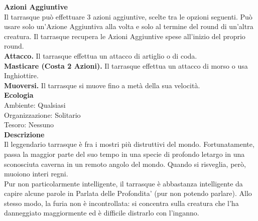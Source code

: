 \begin{multicols}{2}
\textbf{Azioni Aggiuntive}\\
Il tarrasque può effettuare 3 azioni aggiuntive, scelte tra le opzioni seguenti. Può usare solo un'Azione Aggiuntiva alla volta e solo al termine del round di un'altra creatura. Il tarrasque recupera le Azioni Aggiuntive spese all'inizio del proprio round.\\
\textbf{Attacco.} Il tarrasque effettua un attacco di artiglio o di coda. \\
\textbf{Masticare (Costa 2 Azioni).} Il tarrasque effettua un attacco di morso o usa Inghiottire.\\
\textbf{Muoversi.} Il tarrasque si muove fino a metà della sua velocità.\\
\textbf{Ecologia}\\
Ambiente: Qualsiasi\\
Organizzazione: Solitario\\
Tesoro: Nessuno\\
\textbf{Descrizione}\\
Il leggendario tarrasque è fra i mostri più distruttivi del mondo. Fortunatamente, passa la maggior parte del suo tempo in una specie di profondo letargo in una sconosciuta caverna in un remoto angolo del mondo. Quando si risveglia, però, muoiono interi regni.\\
Pur non particolarmente intelligente, il tarrasque è abbastanza intelligente da capire alcune parole in Parlata delle Profondita' (pur non potendo parlare). Allo stesso modo, la furia non è incontrollata: si concentra sulla creatura che l'ha danneggiato maggiormente ed è difficile distrarlo con l'inganno.\\


\end{multicols}
